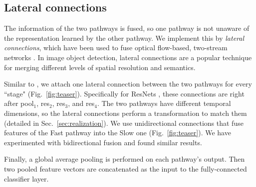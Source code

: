 \documentclass[10pt,twocolumn,letterpaper]{article}
\newcommand{\figref}[1]{Fig.~\ref{#1}}
\newcommand{\sref}[1]{Sec.~\ref{#1}}
\begin{document}
	\subsection{Lateral connections} \label{sec:lateral}
	
	The information of the two pathways is fused, so one pathway is not unaware of the representation learned by the other pathway.
	We implement this by \emph{lateral connections}, which have been used to fuse optical flow-based, two-stream networks 
	\cite{Feichtenhofer2016a,Feichtenhofer2016}.
	In image object detection, lateral connections \cite{Lin2017} are a popular technique for merging different levels of spatial resolution and semantics. 
	
	Similar to \cite{Feichtenhofer2016a,Lin2017}, we attach one lateral connection between the two pathways for every ``stage" (\figref{fig:teaser}). Specifically for ResNets \cite{He2016}, these connections are right after pool$_1$, res$_2$, res$_3$, and res$_4$. The two pathways have different temporal dimensions, so the lateral connections perform a transformation to match them (detailed in \sref{sec:realization}).
	We use unidirectional connections that fuse features of the Fast pathway into the Slow one (\figref{fig:teaser}). We have experimented with bidirectional fusion and found similar results.
	
	Finally, a global average pooling is performed on each pathway's output. Then two pooled feature vectors are concatenated as the input to the fully-connected classifier layer.
	
	\newcommand{\blocks}[3]{\multirow{3}{*}{\(\left[\begin{array}{c}\text{1$\times$1$^\text{2}$, #2}\\[-.1em] \text{1$\times$3$^\text{2}$, #2}\\[-.1em] \text{1$\times$1$^\text{2}$, #1}\end{array}\right]\)$\times$#3}
	}
	\newcommand{\blockt}[3]{\multirow{3}{*}{\(\left[\begin{array}{c}\text{\underline{3$\times$1$^\text{2}$}, #2}\\[-.1em] \text{1$\times$3$^\text{2}$, #2}\\[-.1em] \text{1$\times$1$^\text{2}$, #1}\end{array}\right]\)$\times$#3}
	}
	\newcommand{\outsizes}[7]{\multirow{#7}{*}{\(\begin{array}{c} \text{\emph{Slow}}: \text{#1$\times$#2$^\text{2}$}\\[-.1em] \text{\emph{Fast}}: \text{#4$\times$#5$^\text{2}$}\end{array}\)}
	}
	
\end{document}
